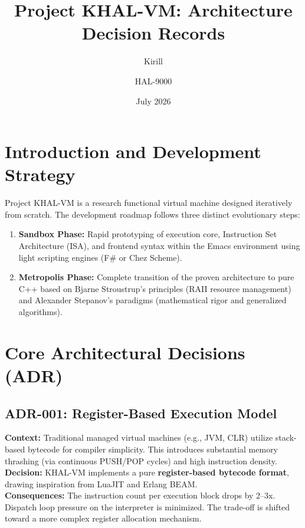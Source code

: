 \documentclass[12pt,a4paper]{article}
\title{\textbf{Project KHAL-VM: Architecture Decision Records}}
\author{Kirill \and HAL-9000}
\date{July 2026}
\begin{document}
\maketitle

\thispagestyle{empty}
\newpage
\pagestyle{plain}

\section{Introduction and Development Strategy}
Project KHAL-VM is a research functional virtual machine designed iteratively from scratch. The development roadmap follows three distinct evolutionary steps:
\begin{enumerate}
    \item \textbf{Sandbox Phase:} Rapid prototyping of execution core, Instruction Set Architecture (ISA), and frontend syntax within the Emacs environment using light scripting engines (F\# or Chez Scheme).
    \item \textbf{Metropolis Phase:} Complete transition of the proven architecture to pure C++ based on Bjarne Stroustrup's principles (RAII resource management) and Alexander Stepanov's paradigms (mathematical rigor and generalized algorithms).
\end{enumerate}

\section{Core Architectural Decisions (ADR)}

\subsection{ADR-001: Register-Based Execution Model}
\textbf{Context:} Traditional managed virtual machines (e.g., JVM, CLR) utilize stack-based bytecode for compiler simplicity. This introduces substantial memory thrashing (via continuous PUSH/POP cycles) and high instruction density. \\
\textbf{Decision:} KHAL-VM implements a pure \textbf{register-based bytecode format}, drawing inspiration from LuaJIT and Erlang BEAM. \\
\textbf{Consequences:} The instruction count per execution block drops by 2--3x. Dispatch loop pressure on the interpreter is minimized. The trade-off is shifted toward a more complex register allocation mechanism.
\end{document}
